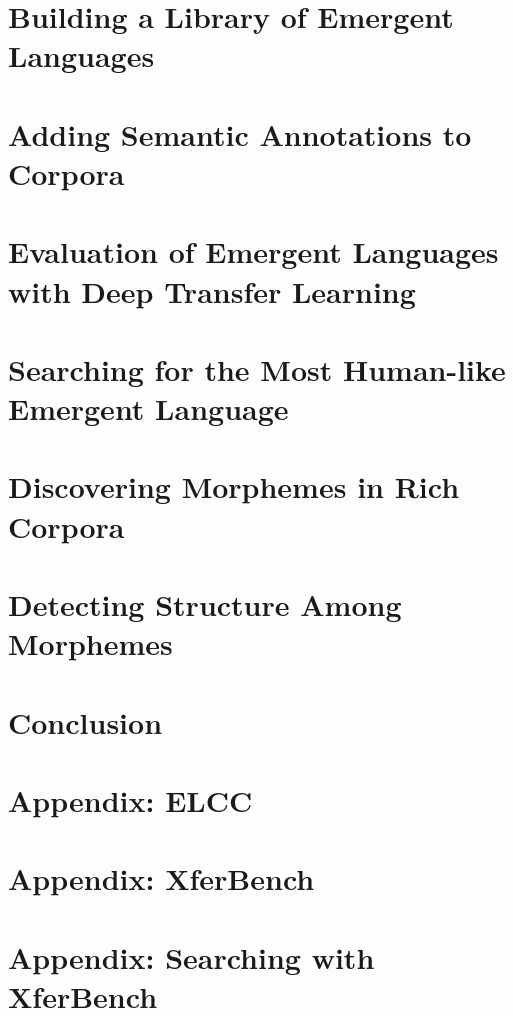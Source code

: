 \newpage
\tableofcontents*



\chapter{Building a Library of Emergent Languages }
\unskip\label{ch:elcc}



\chapter{Adding Semantic Annotations to Corpora }
\unskip\label{ch:rich-corpora}



\chapter{Evaluation of Emergent Languages with Deep Transfer Learning}
\unskip\label{ch:xferbench}


\chapter{Searching for the Most Human-like Emergent Language }
\unskip\label{ch:hpo}



\chapter{Discovering Morphemes in Rich Corpora }
\unskip\label{ch:morphemes}


\chapter{Detecting Structure Among Morphemes }
\unskip\label{ch:syntax}



\chapter{Conclusion}
\unskip\label{ch:conclusion}




\appendix

\chapter{Appendix: ELCC}


\chapter{Appendix: XferBench}


\chapter{Appendix: Searching with XferBench}



